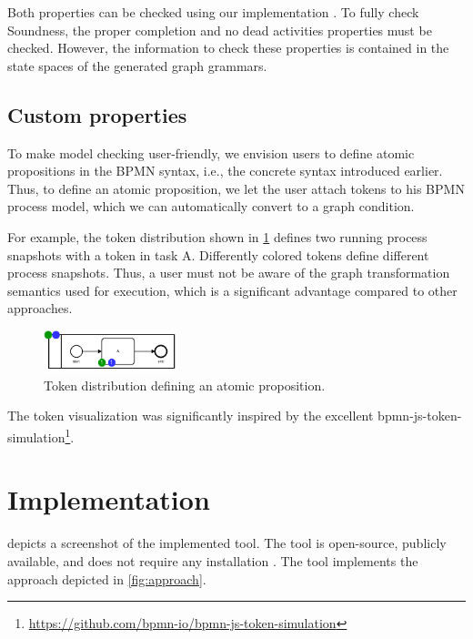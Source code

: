 \documentclass[submission, copyright, creativecommons]{eptcs}
\begin{document}
Both properties can be checked using our implementation \cite{timkrauterArtifactsTERMGRAPH2022}.
To fully check Soundness, the proper completion and no dead activities properties must be checked.
However, the information to check these properties is contained in the state spaces of the generated graph grammars.

\subsection{Custom properties} \label{subsec:customProperties}
To make model checking user-friendly, we envision users to define atomic propositions in the BPMN syntax, i.e., the concrete syntax introduced earlier.
Thus, to define an atomic proposition, we let the user attach tokens to his BPMN process model, which we can automatically convert to a graph condition.

For example, the token distribution shown in \cref{fig:atomicProposition} defines two running process snapshots with a token in task A.
Differently colored tokens define different process snapshots.
Thus, a user must not be aware of the graph transformation semantics used for execution, which is a significant advantage compared to other approaches.

\begin{figure}[h]
    \centering
    \includegraphics[width=0.35\textwidth]{images/bpmn_semantics-atomicProp.pdf}
    \caption{Token distribution defining an atomic proposition.}
    \label{fig:atomicProposition}
\end{figure}

The token visualization was significantly inspired by the excellent bpmn-js-token-simulation\footnote{\url{https://github.com/bpmn-io/bpmn-js-token-simulation}}.
\section{Implementation} \label{sec:impl}
 depicts a screenshot of the implemented tool.
The tool is open-source, publicly available, and does not require any installation \cite{timkrauterArtifactsTERMGRAPH2022}.
The tool implements the approach depicted in \cref{fig:approach}.
\end{document}
